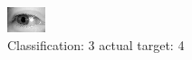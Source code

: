\begin{figure}[h!]
\begin{center}
\includegraphics[width=0.60\columnwidth]{figures/ID3258_class_3_target_4.png}
\end{center}
\caption{ Classification: 3 actual target: 4}
\label{fig:ID3258_class_3_target_4}
\end{figure}
